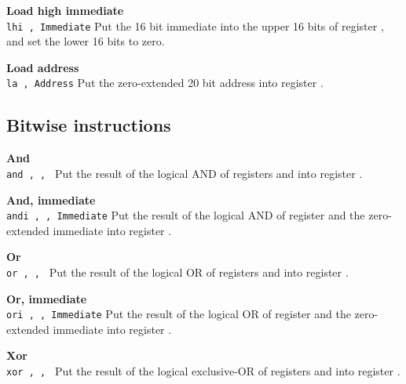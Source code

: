 \noindent
{\bf Load high immediate}\\
\noindent
\texttt{lhi \regd, Immediate}
Put the 16 bit immediate into the upper 16 bits of register \regd{},
and set the lower 16 bits to zero.
\vspace{3ex}
\newpage

\noindent
{\bf Load address}\\
\noindent
\texttt{la \regd, Address}
Put the zero-extended 20 bit address into register \regd{}.
\vspace{3ex}

\subsection{Bitwise instructions}

\noindent
{\bf And}\\
\noindent
\texttt{and \regd, \regs, \regt}
Put the result of the logical AND of registers \regs{} and \regt{} into register \regd{}.
\vspace{3ex}

\noindent
{\bf And, immediate}\\
\noindent
\texttt{andi \regd, \regs, Immediate}
Put the result of the logical AND of register \regs{} and the zero-extended immediate into register \regd{}.
\vspace{3ex}

\noindent
{\bf Or}\\
\noindent
\texttt{or \regd, \regs, \regt}
Put the result of the logical OR of registers \regs{} and \regt{} into register \regd{}.
\vspace{3ex}

\noindent
{\bf Or, immediate}\\
\noindent
\texttt{ori \regd, \regs, Immediate}
Put the result of the logical OR of register \regs{} and the zero-extended immediate into register \regd{}.
\vspace{3ex}

\noindent
{\bf Xor}\\
\noindent
\texttt{xor \regd, \regs, \regt}
Put the result of the logical exclusive-OR of registers \regs{} and \regt{} into register \regd{}.
\vspace{3ex}
\newpage

